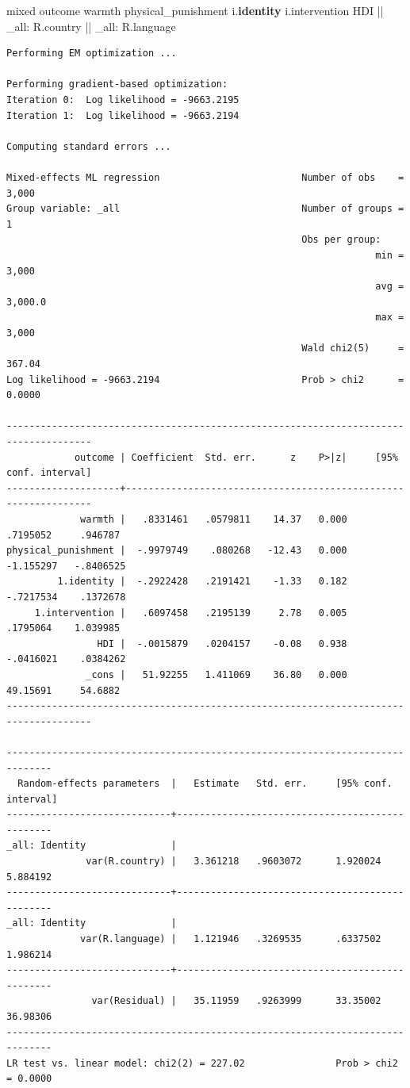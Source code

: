 \documentclass[
  letterpaper,
  DIV=11,
  numbers=noendperiod]{scrreprt}
\newenvironment{Shaded}{\begin{snugshade}}{\end{snugshade}}
\newcommand{\DataTypeTok}[1]{\textcolor[rgb]{0.68,0.00,0.00}{#1}}
\newcommand{\KeywordTok}[1]{\textcolor[rgb]{0.00,0.23,0.31}{\textbf{#1}}}
\newcommand{\NormalTok}[1]{\textcolor[rgb]{0.00,0.23,0.31}{#1}}
\begin{document}
\begin{Shaded}
\begin{Highlighting}[]

\NormalTok{mixed outcome warmth physical\_punishment i.}\KeywordTok{identity}\NormalTok{ i.intervention HDI || }\DataTypeTok{\_all}\NormalTok{: R.country || }\DataTypeTok{\_all}\NormalTok{: R.language}
\end{Highlighting}
\end{Shaded}

\begin{verbatim}
Performing EM optimization ...

Performing gradient-based optimization: 
Iteration 0:  Log likelihood = -9663.2195  
Iteration 1:  Log likelihood = -9663.2194  

Computing standard errors ...

Mixed-effects ML regression                         Number of obs    =   3,000
Group variable: _all                                Number of groups =       1
                                                    Obs per group:
                                                                 min =   3,000
                                                                 avg = 3,000.0
                                                                 max =   3,000
                                                    Wald chi2(5)     =  367.04
Log likelihood = -9663.2194                         Prob > chi2      =  0.0000

-------------------------------------------------------------------------------------
            outcome | Coefficient  Std. err.      z    P>|z|     [95% conf. interval]
--------------------+----------------------------------------------------------------
             warmth |   .8331461   .0579811    14.37   0.000     .7195052     .946787
physical_punishment |  -.9979749    .080268   -12.43   0.000    -1.155297   -.8406525
         1.identity |  -.2922428   .2191421    -1.33   0.182    -.7217534    .1372678
     1.intervention |   .6097458   .2195139     2.78   0.005     .1795064    1.039985
                HDI |  -.0015879   .0204157    -0.08   0.938    -.0416021    .0384262
              _cons |   51.92255   1.411069    36.80   0.000     49.15691     54.6882
-------------------------------------------------------------------------------------

------------------------------------------------------------------------------
  Random-effects parameters  |   Estimate   Std. err.     [95% conf. interval]
-----------------------------+------------------------------------------------
_all: Identity               |
              var(R.country) |   3.361218   .9603072      1.920024    5.884192
-----------------------------+------------------------------------------------
_all: Identity               |
             var(R.language) |   1.121946   .3269535      .6337502    1.986214
-----------------------------+------------------------------------------------
               var(Residual) |   35.11959   .9263999      33.35002    36.98306
------------------------------------------------------------------------------
LR test vs. linear model: chi2(2) = 227.02                Prob > chi2 = 0.0000


\end{verbatim}
\end{document}
